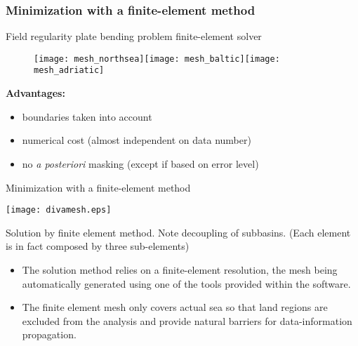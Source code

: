\begin{frame}
\footnotesize
\frametitle{Minimization with a finite-element method}

Field regularity \fleche plate bending problem \fleche finite-element solver

\begin{figure}[H]
\centering
\texttt{[image: mesh\_northsea]}\texttt{[image: mesh\_baltic]}\texttt{[image: mesh\_adriatic]}
\end{figure}
\textbf{Advantages:}
\begin{itemize}
\item boundaries taken into account
\item numerical cost (almost independent on data number)
\item no \textit{a posteriori} masking (except if based on error level) 
\end{itemize}

\end{frame}


\begin{frame}{Minimization with a finite-element method}
\centerline{
\texttt{[image: divamesh.eps]}
}
Solution by finite element method. %
Note decoupling of subbasins. (Each element is in fact composed by three sub-elements) %
\begin{itemize}
\item The solution method relies on a finite-element resolution, the mesh being automatically generated using one of the tools provided within the software. 
\item The finite element mesh only covers actual sea so that land regions are excluded from the analysis and provide natural barriers for data-information propagation.
\end{itemize}
\end{frame}

